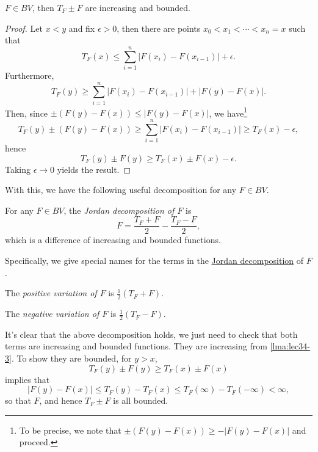 \begin{lemma}\label{lma:lec34-3}
	\(F \in BV\), then \(T_F \pm F\) are increasing and bounded.
\end{lemma}

\begin{proof}
	Let \(x < y\) and fix \(\epsilon > 0\), then there are points \(x_0 < x_1 < \cdots < x_n = x\) such that
	\[
		T_F(x) \leq \sum_{i=1}^n \left\vert F(x_i) - F(x_{i-1}) \right\vert + \epsilon.
	\]
	Furthermore,
	\[
		T_F(y) \geq \sum_{i=1}^n \left\vert F(x_i) - F(x_{i-1}) \right\vert + \left\vert F(y) - F(x) \right\vert .
	\]
	Then, since \(\pm(F(y) - F(x)) \leq \left\vert F(y) - F(x) \right\vert \), we have\footnote{To be precise, we note that \(\pm (F(y) - F(x)) \geq - \left\vert F(y) - F(x) \right\vert \) and proceed.}
	\[
		T_F(y) \pm (F(y) - F(x)) \geq \sum_{i=1}^n \left\vert F(x_i) - F(x_{i-1}) \right\vert \geq T_F(x) - \epsilon,
	\]
	hence
	\[
		T_F(y) \pm F(y) \geq T_F(x) \pm F(x) - \epsilon.
	\]
	Taking \(\epsilon \to 0\) yields the result.
\end{proof}

With this, we have the following useful decomposition for any \(F\in BV\).
\begin{definition}\label{def:Jordan-decomposition}
	For any \(F \in BV\), the \emph{Jordan decomposition of \(F\)} is
	\[
		F = \frac{T_F + F}{2} - \frac{T_F - F}{2},
	\]
	which is a difference of increasing and bounded functions.

	Specifically, we give special names for the terms in the \hyperref[def:Jordan-decomposition]{Jordan decomposition} of \(F\).
	\begin{definition}\label{def:positive-variation-function}
		The \emph{positive variation of \(F\)} is \(\frac{1}{2}(T_{F} +F)\).
	\end{definition}
	\begin{definition}\label{def:negative-variation-function}
		The \emph{negative variation of \(F\)} is \(\frac{1}{2}(T_{F} - F)\).
	\end{definition}
\end{definition}
\begin{explanation}
	It's clear that the above decomposition holds, we just need to check that both terms are increasing and bounded functions. They are
	increasing from \autoref{lma:lec34-3}. To show they are bounded, for \(y > x\),
	\[
		T_F(y)\pm F(y) \geq T_F(x) \pm F(x)
	\]
	implies that
	\[
		\left\vert F(y) - F(x) \right\vert \leq T_F(y) - T_{F} (x) \leq T_{F} (\infty ) - T_{F} (-\infty ) < \infty,
	\]
	so that \(F\), and hence \(T_{F} \pm F\) is all bounded.
\end{explanation}

